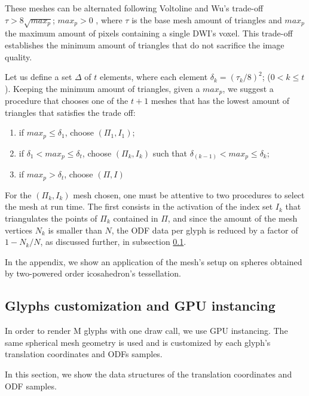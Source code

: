 \documentclass[twoside,twocolumn,10pt]{article}
\begin{document}
These meshes can be alternated following Voltoline and Wu's trade-off $\tau > 8\sqrt{max_p}$; $max_p > 0$ \cite{voltoline2021}, where $\tau$ is the base mesh amount of triangles and $max_p$ the maximum amount of pixels containing a single DWI's voxel. This trade-off establishes the minimum amount of triangles that do not sacrifice the image quality.

Let us define a set $\Delta$ of $t$ elements, where each element $\delta_k = (\tau_k/8)^2$; ($0 < k \leq t$). Keeping the minimum amount of triangles, given a $max_p$, we suggest a procedure that chooses one of the $t+1$ meshes that has the lowest amount of triangles that satisfies the trade off:

\begin{enumerate}
    \item if $max_p \leq \delta_1$, choose $(\Pi_1, I_1)$;
    \item if $\delta_{1} < max_p \leq \delta_{t}$, choose $(\Pi_k, I_k)$ such that $\delta_{(k-1)} < max_p \leq \delta_{k}$;
    \item if $max_p > \delta_{t}$, choose $(\Pi, I)$
\end{enumerate}

For the $(\Pi_k, I_k)$ mesh chosen, one must be attentive to two procedures to select the mesh at run time. The first consists in the activation of the index set $I_k$ that triangulates the points of $\Pi_k$ contained in $\Pi$,  and since the amount of the mesh vertices $N_k$ is smaller than $N$, the ODF data per glyph is reduced by a factor of $1-N_k/N$, as discussed further, in subsection \ref{ssec::glyph_customization}.

In the appendix, we show an application of the mesh's setup on spheres obtained by two-powered order icosahedron's tessellation.

\subsection{Glyphs customization and GPU instancing}
\label{ssec::glyph_customization}

In order to render M glyphs with one draw call, we use GPU instancing. The same spherical mesh geometry is used and is customized by each glyph's translation coordinates and ODFs samples.

In this section, we show the data structures of the translation coordinates and ODF samples.
\end{document}
